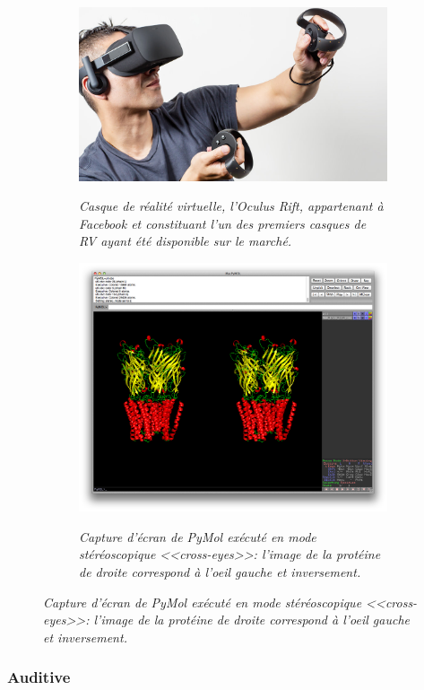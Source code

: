 \begin{figure}
\begin{subfigure}{.5\textwidth}
  \centering
  {\includegraphics[width=.75\linewidth]{./figures/ch2/occulus}}
    \caption{{\it Casque de réalité virtuelle, l'Oculus Rift, appartenant à Facebook et constituant l'un des premiers casques de RV ayant été disponible sur le marché.}}
  \label{Fig:occulus}
  \hspace{0.3cm}
\end{subfigure}
\begin{subfigure}{.5\textwidth}
  \centering
  {\includegraphics[width=.75\linewidth]{./figures/ch2/pymol_stereo}}
    \caption{{\it Capture d'écran de PyMol exécuté en mode stéréoscopique <<cross-eyes>>: l'image de la protéine de droite correspond à l'oeil gauche et inversement.}}
  \label{Fig:pymol_stereo}
  \hspace{0.3cm}
\end{subfigure}
\end{figure}



\subsubsection{Auditive} \label{immersion_audio}

